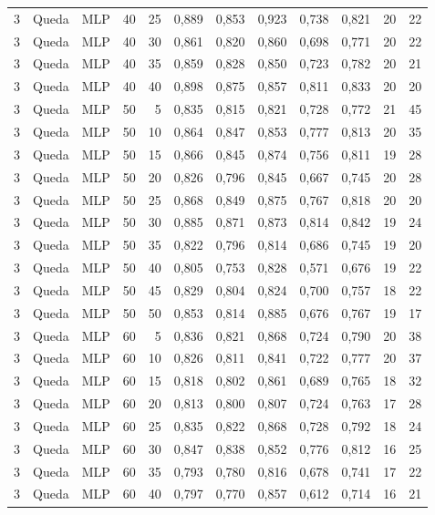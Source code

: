 \begin{longtable}{ccclrrrrrrrr}
3 & Queda & MLP & 40 & 25 & 0,889 & 0,853 & 0,923 & 0,738 & 0,821 & 20 & 22 \\
3 & Queda & MLP & 40 & 30 & 0,861 & 0,820 & 0,860 & 0,698 & 0,771 & 20 & 22 \\
3 & Queda & MLP & 40 & 35 & 0,859 & 0,828 & 0,850 & 0,723 & 0,782 & 20 & 21 \\
3 & Queda & MLP & 40 & 40 & 0,898 & 0,875 & 0,857 & 0,811 & 0,833 & 20 & 20 \\
3 & Queda & MLP & 50 & 5 & 0,835 & 0,815 & 0,821 & 0,728 & 0,772 & 21 & 45 \\
3 & Queda & MLP & 50 & 10 & 0,864 & 0,847 & 0,853 & 0,777 & 0,813 & 20 & 35 \\
3 & Queda & MLP & 50 & 15 & 0,866 & 0,845 & 0,874 & 0,756 & 0,811 & 19 & 28 \\
3 & Queda & MLP & 50 & 20 & 0,826 & 0,796 & 0,845 & 0,667 & 0,745 & 20 & 28 \\
3 & Queda & MLP & 50 & 25 & 0,868 & 0,849 & 0,875 & 0,767 & 0,818 & 20 & 20 \\
3 & Queda & MLP & 50 & 30 & 0,885 & 0,871 & 0,873 & 0,814 & 0,842 & 19 & 24 \\
3 & Queda & MLP & 50 & 35 & 0,822 & 0,796 & 0,814 & 0,686 & 0,745 & 19 & 20 \\
3 & Queda & MLP & 50 & 40 & 0,805 & 0,753 & 0,828 & 0,571 & 0,676 & 19 & 22 \\
3 & Queda & MLP & 50 & 45 & 0,829 & 0,804 & 0,824 & 0,700 & 0,757 & 18 & 22 \\
3 & Queda & MLP & 50 & 50 & 0,853 & 0,814 & 0,885 & 0,676 & 0,767 & 19 & 17 \\
3 & Queda & MLP & 60 & 5 & 0,836 & 0,821 & 0,868 & 0,724 & 0,790 & 20 & 38 \\
3 & Queda & MLP & 60 & 10 & 0,826 & 0,811 & 0,841 & 0,722 & 0,777 & 20 & 37 \\
3 & Queda & MLP & 60 & 15 & 0,818 & 0,802 & 0,861 & 0,689 & 0,765 & 18 & 32 \\
3 & Queda & MLP & 60 & 20 & 0,813 & 0,800 & 0,807 & 0,724 & 0,763 & 17 & 28 \\
3 & Queda & MLP & 60 & 25 & 0,835 & 0,822 & 0,868 & 0,728 & 0,792 & 18 & 24 \\
3 & Queda & MLP & 60 & 30 & 0,847 & 0,838 & 0,852 & 0,776 & 0,812 & 16 & 25 \\
3 & Queda & MLP & 60 & 35 & 0,793 & 0,780 & 0,816 & 0,678 & 0,741 & 17 & 22 \\
3 & Queda & MLP & 60 & 40 & 0,797 & 0,770 & 0,857 & 0,612 & 0,714 & 16 & 21 \\

\end{longtable}
